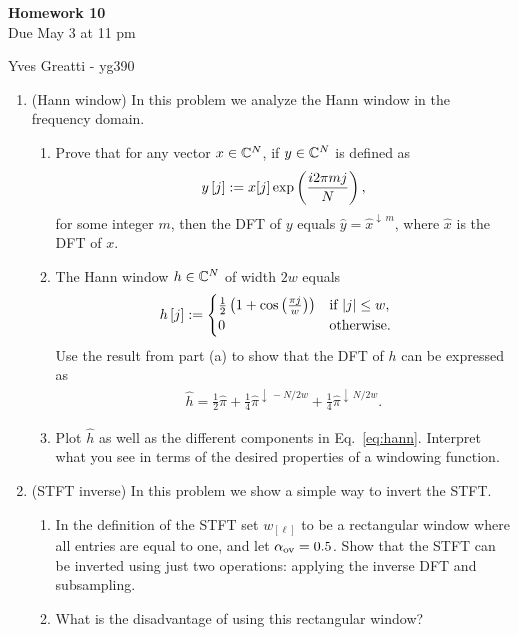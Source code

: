 \documentclass[12pt,twoside]{article}
\begin{document}
\begin{center}
{\large{\textbf{Homework 10}} } \vspace{0.2cm}\\
Due May 3 at 11 pm
\end{center}
Yves Greatti - yg390\\

\begin{enumerate}

\item (Hann window)
In this problem we analyze the Hann window in the frequency domain. 
 \begin{enumerate}
 \item Prove that for any vector $x \in \mathbb{C}^{N}$, if $y \in \mathbb{C}^{N}$ is defined as 
\begin{align}
y \,[j] := x[j] \exp \left( \frac{i2 \pi m j}{N}  \right),
\end{align}
for some integer $m$, then the DFT of $y$ equals $\hat{y}=\hat{x}^{\downarrow \, m}$, where $\hat{x}$ is the DFT of $x$.
 \item The Hann window $h \in \mathbb{C}^{N}$ of width $2w$ equals
\begin{align}
h\left[ j \right] & :=  
 \begin{cases}
  \frac{1}{2} \left( 1 + \cos \left(  \frac{ \pi j}{w} \right) \right) & \text{if } \lvert j\rvert \leq w,\\
   0 & \text{otherwise.}
  \end{cases}
\end{align} 
Use the result from part (a) to show that the DFT of $h$ can be expressed as
\begin{align}
\label{eq:hann}
\hat{h} = \frac{1}{2}\hat{\pi} + \frac{1}{4}\hat{\pi}^{\downarrow \, -N/2w} + \frac{1}{4}\hat{\pi}^{\downarrow \, N/2w}.
\end{align}
\item Plot $\hat{h}$ as well as the different components in Eq.~\eqref{eq:hann}. Interpret what you see in terms of the desired properties of a windowing function. 
 \end{enumerate}
  
 \item (STFT inverse) In this problem we show a simple way to invert the STFT.
 \begin{enumerate}
  \item In the definition of the STFT set $w_{[\ell]}$ to be a rectangular window where all entries are equal to one, and let $\alpha_{\operatorname{ov}}=0.5$. Show that the STFT can be inverted using just two operations: applying the inverse DFT and subsampling.
  \item What is the disadvantage of using this rectangular window?
  \end{enumerate}
 

\end{enumerate}
\end{document}
